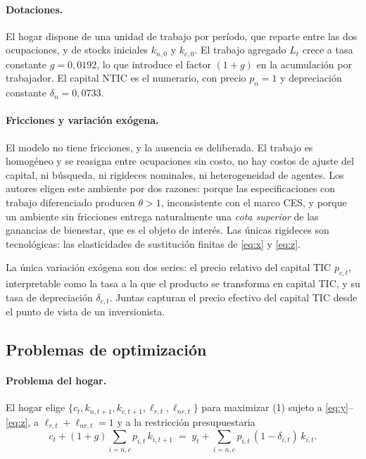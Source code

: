 \documentclass[12pt,letterpaper]{article}
\newcommand{\lrt}{\ell_{r,t}}
\newcommand{\lnrt}{\ell_{nr,t}}
\begin{document}
\paragraph{Dotaciones.}
El hogar dispone de una unidad de trabajo por período, que reparte entre las dos
ocupaciones, y de stocks iniciales $k_{n,0}$ y $k_{c,0}$. El trabajo agregado $L_t$
crece a tasa constante $g=0{,}0192$, lo que introduce el factor $(1+g)$ en la
acumulación por trabajador. El capital NTIC es el numerario, con precio $p_{n}=1$ y
depreciación constante $\delta_{n}=0{,}0733$.

\paragraph{Fricciones y variación exógena.}
El modelo no tiene fricciones, y la ausencia es deliberada. El trabajo es homogéneo y
se reasigna entre ocupaciones sin costo, no hay costos de ajuste del capital, ni
búsqueda, ni rigideces nominales, ni heterogeneidad de agentes. Los autores eligen
este ambiente por dos razones: porque las especificaciones con trabajo diferenciado
producen $\theta>1$, inconsistente con el marco CES, y porque un ambiente sin
fricciones entrega naturalmente una \emph{cota superior} de las ganancias de
bienestar, que es el objeto de interés. Las únicas rigideces son tecnológicas: las
elasticidades de sustitución finitas de \eqref{eq:x} y \eqref{eq:z}.

La única variación exógena son dos series: el precio relativo del capital TIC
$p_{c,t}$, interpretable como la tasa a la que el producto se transforma en capital
TIC, y su tasa de depreciación $\delta_{c,t}$. Juntas capturan el precio efectivo del
capital TIC desde el punto de vista de un inversionista.

\subsection{Problemas de optimización}

\paragraph{Problema del hogar.}
El hogar elige $\{c_t, k_{n,t+1}, k_{c,t+1}, \lrt, \lnrt\}$ para maximizar (1)
sujeto a \eqref{eq:y}--\eqref{eq:z}, a $\lrt+\lnrt=1$ y a la restricción
presupuestaria
\begin{equation}
c_{t} + (1+g)\sum_{i=n,c} p_{i,t}\,k_{i,t+1}
\;=\; y_{t} + \sum_{i=n,c} p_{i,t}\,(1-\delta_{i,t})\,k_{i,t}.
\label{eq:bc}
\end{equation}
\end{document}

